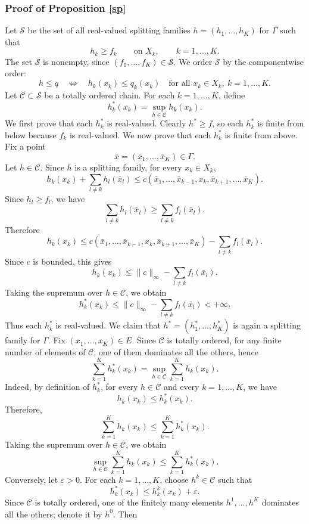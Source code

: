 \documentclass[twoside,11pt,a4paper]{article}
\newcommand*{\SavedRef}{}
\let\SavedRef\ref
\renewcommand*{\ref}[1]{  \begingroup
    \hypersetup{
      linkcolor=linkequation,
      linkbordercolor=linkequation,
    }    \SavedRef{#1}  \endgroup
}
\begin{document}
\subsubsection*{Proof of Proposition \ref{sp}}
Let \(\mathcal S\) be the set of all real-valued splitting families
\(h=(h_1,\ldots,h_K)\)
for \(\Gamma\) such that
\[
h_k\ge f_k
\qquad\text{on }X_k,\qquad k=1,\ldots,K.
\]
The set \(\mathcal S\) is nonempty, since \((f_1,\ldots,f_K)\in\mathcal S\).
We order \(\mathcal S\) by the componentwise order:
\[
h\le q
\quad\Longleftrightarrow\quad
h_k(x_k)\le q_k(x_k)
\quad\text{for all }x_k\in X_k,\ k=1,\ldots,K.
\]
Let \(\mathcal C\subset\mathcal S\) be a totally ordered chain. For each
\(k=1,\ldots,K\), define
\[
h_k^*(x_k)=\sup_{h\in\mathcal C}h_k(x_k).
\]
We first prove that each \(h_k^*\) is real-valued. Clearly \(h^*\ge f\), so
each \(h_k^*\) is finite from below because \(f_k\) is real-valued. We now prove
that each \(h_k^*\) is finite from above. Fix a point
\[
\bar x=(\bar x_1,\ldots,\bar x_K)\in\Gamma .
\]
Let \(h\in\mathcal C\). Since \(h\) is a splitting family, for every
\(x_k\in X_k\),
\[
h_k(x_k)+\sum_{l\ne k}h_l(\bar x_l)
\le
c(\bar x_1,\ldots,\bar x_{k-1},x_k,\bar x_{k+1},\ldots,\bar x_K).
\]
Since \(h_l\ge f_l\), we have
\[
\sum_{l\ne k}h_l(\bar x_l)
\ge
\sum_{l\ne k}f_l(\bar x_l).
\]
Therefore
\[
h_k(x_k)
\le
c(\bar x_1,\ldots,\bar x_{k-1},x_k,\bar x_{k+1},\ldots,\bar x_K)
-
\sum_{l\ne k}f_l(\bar x_l).
\]
Since \(c\) is bounded, this gives
\[
h_k(x_k)
\le
\|c\|_\infty-\sum_{l\ne k}f_l(\bar x_l).
\]
Taking the supremum over \(h\in\mathcal C\), we obtain
\[
h_k^*(x_k)
\le
\|c\|_\infty-\sum_{l\ne k}f_l(\bar x_l)<+\infty.
\]
Thus each \(h_k^*\) is real-valued.
We claim that \(h^*=(h_1^*,\ldots,h_K^*)\) is again a splitting family for
\(\Gamma\). Fix \((x_1,\ldots,x_K)\in E\). Since \(\mathcal C\) is totally
ordered, for any finite number of elements of \(\mathcal C\), one of them
dominates all the others, hence
\[
\sum_{k=1}^K h_k^*(x_k)
=
\sup_{h\in\mathcal C}\sum_{k=1}^K h_k(x_k).
\]
Indeed, by definition of \(h_k^*\), for every \(h\in\mathcal C\) and every
\(k=1,\ldots,K\), we have
\[
h_k(x_k)\le h_k^*(x_k).
\]
Therefore,
\[
\sum_{k=1}^K h_k(x_k) \le \sum_{k=1}^K h_k^*(x_k).
\]
Taking the supremum over \(h\in\mathcal C\), we obtain
\[
\sup_{h\in\mathcal C}\sum_{k=1}^K h_k(x_k)
\le
\sum_{k=1}^K h_k^*(x_k).
\]
Conversely, let \(\varepsilon>0\). For each \(k=1,\ldots,K\), choose
\(h^k\in\mathcal C\) such that
\[
h_k^*(x_k)\le h_k^k(x_k)+\varepsilon.
\]
Since \(\mathcal C\) is totally ordered, one of the finitely many elements
\(h^1,\ldots,h^K\) dominates all the others; denote it by \(h^0\). Then
\end{document}

